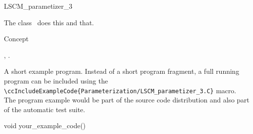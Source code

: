 

\begin{ccRefClass}{LSCM_parametizer_3}  %


\ccDefinition
  
The class \ccRefName\ does this and that.


\ccIsModel

Concept

\ccTypes


\ccCreation
{}  %


\ccOperations


\ccSeeAlso

,
.

\ccExample

A short example program.
Instead of a short program fragment, a full running program can be
included using the 
\verb|\ccIncludeExampleCode{Parameterization/LSCM_parametizer_3.C}| 
macro. The program example would be part of the source code distribution and
also part of the automatic test suite.

\begin{ccExampleCode}
void your_example_code() {
}
\end{ccExampleCode}


\end{ccRefClass}


